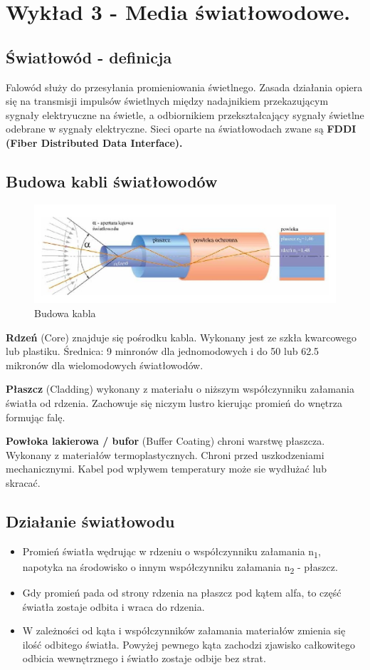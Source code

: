 \documentclass{article}
\begin{document}
\section{Wykład 3 - Media światłowodowe.}
\subsection{Światłowód - definicja}
Falowód służy do przesyłania promieniowania świetlnego. Zasada działania opiera się na transmisji impulsów świetlnych między nadajnikiem przekazującym sygnały elektryuczne na świetle, a odbiornikiem przekształcający sygnały świetlne odebrane w sygnały elektryczne. Sieci oparte na światłowodach zwane są \textbf{FDDI (Fiber Distributed Data Interface).}
\subsection{Budowa kabli światłowodów}
\begin{figure}[H]
    \centering
    \includegraphics[width=0.7\linewidth]{w03z01.jpg}
    \caption{Budowa kabla}
\end{figure}
\textbf{Rdzeń} (Core) znajduje się pośrodku kabla. Wykonany jest ze szkła kwarcowego lub plastiku. Średnica: 9 minronów dla jednomodowych i do 50 lub 62.5 mikronów dla wielomodowych światłowodów.

\textbf{Płaszcz} (Cladding) wykonany z materiału o niższym współczynniku załamania światła od rdzenia. Zachowuje się niczym lustro kierując promień do wnętrza formując falę.

\textbf{Powłoka lakierowa / bufor} (Buffer Coating) chroni warstwę płaszcza. Wykonany z materiałów termoplastycznych. Chroni przed uszkodzeniami mechanicznymi. Kabel pod wpływem temperatury może sie wydłużać lub skracać.
\subsection{Działanie światłowodu}
\begin{itemize}
    \item Promień światła wędrując w rdzeniu o współczynniku załamania n\textsubscript1, napotyka na środowisko o innym współczynniku załamania n\textsubscript2 - płaszcz.
    \item Gdy promień pada od strony rdzenia na płaszcz pod kątem alfa, to część światła zostaje odbita i wraca do rdzenia.
    \item W zależności od kąta i współczynników załamania materiałów zmienia się ilość odbitego światła. Powyżej pewnego kąta zachodzi zjawisko całkowitego odbicia wewnętrznego i światło zostaje odbije bez strat.
\end{itemize}
\end{document}
